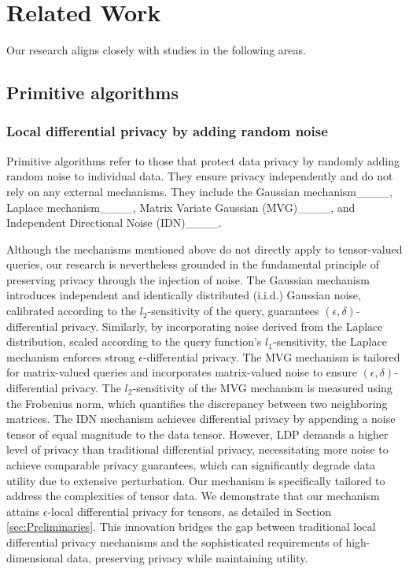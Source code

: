 \section{Related Work}
\label{sec:RelatedWork}
Our research aligns closely with studies in the following areas.
\subsection{Primitive algorithms}
\subsubsection{Local differential privacy by adding random noise}
Primitive algorithms refer to those that protect data privacy by randomly adding random noise to individual data. They ensure privacy independently and do not rely on any external mechanisms. They include the Gaussian mechanism____, Laplace mechanism____, Matrix Variate Gaussian (MVG)____, and Independent Directional Noise (IDN)____.

Although the mechanisms mentioned above do not directly apply to tensor-valued queries, our research is nevertheless grounded in the fundamental principle of preserving privacy through the injection of noise.
The Gaussian mechanism introduces independent and identically distributed (i.i.d.) Gaussian noise, calibrated according to the $l_2$-sensitivity of the query, guarantees $(\epsilon, \delta)$-differential privacy. Similarly, by incorporating noise derived from the Laplace distribution, scaled according to the query function's $l_1$-sensitivity, the Laplace mechanism enforces strong $\epsilon$-differential privacy. 
The MVG mechanism is tailored for matrix-valued queries and incorporates matrix-valued noise to ensure $(\epsilon, \delta)$-differential privacy. The $l_2$-sensitivity of the MVG mechanism is measured using the Frobenius norm, which quantifies the discrepancy between two neighboring matrices. 
The IDN mechanism achieves differential privacy by appending a noise tensor of equal magnitude to the data tensor. However, LDP demands a higher level of privacy than traditional differential privacy, necessitating more noise to achieve comparable privacy guarantees, which can significantly degrade data utility due to extensive perturbation.
Our mechanism is specifically tailored to address the complexities of tensor data. We demonstrate that our mechanism attains $\epsilon$-local differential privacy for tensors, as detailed in Section \ref{sec:Preliminaries}. This innovation bridges the gap between traditional local differential privacy mechanisms and the sophisticated requirements of high-dimensional data, preserving privacy while maintaining utility. 

